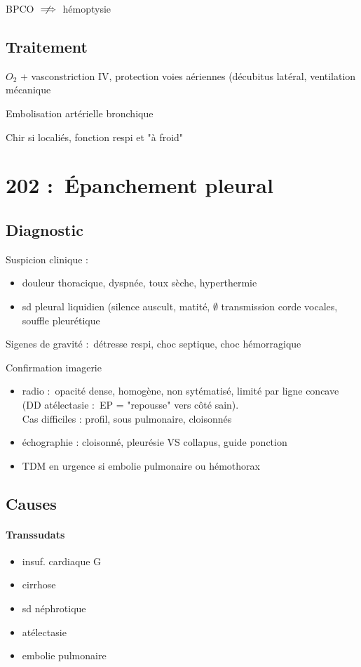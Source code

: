 \documentclass{article}
\newcommand*{\TakeFourierOrnament}[1]{{%
\fontencoding{U}\fontfamily{futs}\selectfont\char#1}}
\newcommand*{\danger}{\TakeFourierOrnament{66}}
\begin{document}
\danger BPCO $\centernot\implies$ hémoptysie

\subsection{Traitement}
$O_2$ + vasconstriction IV, protection voies aériennes (décubitus latéral,
ventilation mécanique

Embolisation artérielle bronchique

Chir si localiés, fonction respi et "à froid"




\section{202 : Épanchement pleural}%
\label{sec:epanchement_pleural}

\subsection{Diagnostic}
Suspicion clinique :
\begin{itemize}
  \item douleur thoracique, dyspnée, toux sèche, hyperthermie
  \item sd pleural liquidien (silence auscult, matité, $\emptyset$ transmission
    corde vocales, souffle pleurétique
\end{itemize}
Sigenes de gravité : détresse respi, choc septique, choc hémorragique

Confirmation imagerie
\begin{itemize}
  \item radio : opacité dense, homogène, non sytématisé, limité par ligne
    concave (DD atélectasie : EP = "repousse" vers côté sain). \\
    Cas difficiles : profil, sous pulmonaire, cloisonnés
  \item échographie : cloisonné, pleurésie VS collapus, guide ponction
  \item TDM en urgence si embolie pulmonaire ou hémothorax
\end{itemize}

\subsection{Causes}
\paragraph{Transsudats}
\begin{itemize}
  \item insuf. cardiaque G
  \item cirrhose
  \item sd néphrotique
  \item atélectasie
  \item embolie pulmonaire
\end{itemize}
\end{document}

